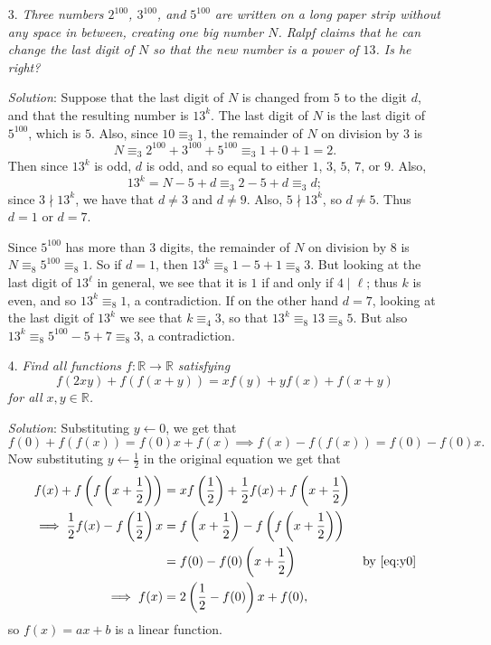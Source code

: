 \documentclass{article}
\begin{document}
\begin{enumerate}
\item[3.] %
\textit{Three numbers $2^{100}$, $3^{100}$, and $5^{100}$ are written on a long paper strip without any space in between, creating one big number $N$.
Ralpf claims that he can change the last digit of $N$ so that the new number is a power of $13$.
Is he right?}

\textit{Solution}:
Suppose that the last digit of $N$ is changed from $5$ to the digit $d$, and that the resulting number is $13^k$.
The last digit of $N$ is the last digit of $5^{100}$, which is $5$.
Also, since $10 \equiv_3 1$, the remainder of $N$ on division by $3$ is
\[ N \equiv_3 2^{100} +3^{100} +5^{100} \equiv_3 1 + 0 + 1 = 2. \]
Then since $13^k$ is odd, $d$ is odd, and so equal to either $1$, $3$, $5$, $7$, or $9$.
Also,
\[ 13^k = N -5 +d \equiv_3 2-5+d \equiv_3 d; \]
since $3 \nmid 13^k$, we have that $d \neq 3$ and $d \neq 9$.
Also, $5 \nmid 13^k$, so $d \neq 5$. Thus $d = 1$ or $d = 7$.

Since $5^{100}$ has more than 3 digits, the remainder of $N$ on division by $8$ is $N \equiv_8 5^{100} \equiv_8 1$.
So if $d = 1$, then $13^k \equiv_8 1-5+1 \equiv_8 3$.
But looking at the last digit of $13^\ell$ in general, we see that it is $1$ if and only if $4 \mid \ell$; thus $k$ is even, and so $13^k \equiv_8 1$, a contradiction.
If on the other hand $d = 7$, looking at the last digit of $13^k$ we see that $k \equiv_4 3$, so that $13^k \equiv_8 13 \equiv_8 5$.
But also $13^k \equiv_8 5^{100} -5 +7 \equiv_8 3$, a contradiction.


\item[4.] %
\textit{Find all functions $f: \mathbb{R} \to \mathbb{R}$ satisfying
\[ f(2xy) +f(f(x+y)) = xf(y) + yf(x) +f(x+y) \]
for all $x,y \in \mathbb{R}$.}

\textit{Solution}:
Substituting $y \leftarrow 0$, we get that
\begin{equation} \label{eq:y0}
  f(0) +f(f(x)) = f(0)x +f(x) \implies f(x) -f(f(x)) = f(0) -f(0)x.
\end{equation}
Now substituting $y \leftarrow \frac{1}{2}$ in the original equation we get that
\begin{align*}
  f(x) +f\left(f\left(x+\frac{1}{2}\right)\right) &= x f\left(\frac{1}{2}\right) +\frac{1}{2} f(x) +f\left(x+\frac{1}{2}\right) \\
  \implies \frac{1}{2} f(x) -f\left(\frac{1}{2}\right) x &= f\left(x+\frac{1}{2}\right) -f\left(f\left(x+\frac{1}{2}\right)\right) \\
  &= f(0) -f(0) \left(x+\frac{1}{2}\right) & \text{by \eqref{eq:y0}} \\
  \implies f(x) &= 2\left(\frac{1}{2}-f(0)\right) x +f(0),
\end{align*}
so $f(x) = ax+b$ is a linear function.


\end{enumerate}
\end{document}
